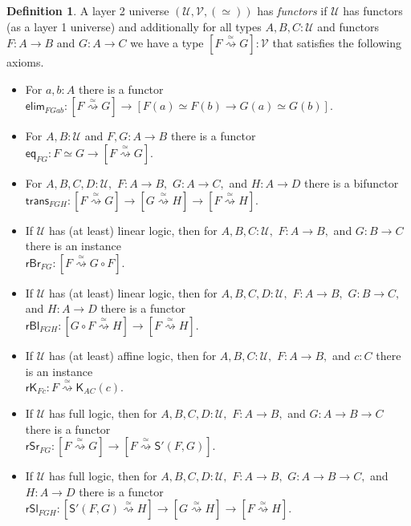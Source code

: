 \documentclass[a4paper]{article}
\theoremstyle{definition}
\newtheorem{definition}{Definition}[section]
\theoremstyle{remark}
\newcommand{\defn}{\emph}
\renewcommand{\equiv}{\simeq}
\newcommand{\equivto}{\overset{\equiv}{\rightsquigarrow}}
\newcommand{\U}{\mathcal{U}}
\newcommand{\V}{\mathcal{V}}
\newcommand{\nm}{\mathsf}
\newcommand{\elim}{\nm{elim}}
\newcommand{\combinator}{\nm}
\newcommand{\constFun}{\combinator{K}}
\newcommand{\substFun}{\combinator{S'}}
\begin{document}
\begin{definition}
  A layer 2 universe $(\U,\V,(\equiv))$ has \defn{functors} if $\U$ has functors (as a layer 1
  universe) and additionally for all types $A,B,C : \U$ and functors $F : A \to B$ and $G : A \to C$
  we have a type $[F \equivto G] : \V$ that satisfies the following axioms.
  \begin{itemize}
    \item For $a,b : A$ there is a functor\\
    $\elim_{FGab} : [F \equivto G] \to [F(a) \equiv F(b) \to G(a) \equiv G(b)].$
    \item For $A,B : \U$ and $F,G : A \to B$ there is a functor\\
    $\nm{eq}_{FG} : F \equiv G \to [F \equivto G].$
    \item For $A,B,C,D : \U,$ $F : A \to B,$ $G : A \to C,$ and $H : A \to D$ there is a bifunctor\\
    $\nm{trans}_{FGH} : [F \equivto G] \to [G \equivto H] \to [F \equivto H].$
    \item If $\U$ has (at least) linear logic, then for $A,B,C : \U,$ $F : A \to B,$ and
    $G : B \to C$ there is an instance\\
    $\nm{rBr}_{FG} : [F \equivto G \circ F].$
    \item If $\U$ has (at least) linear logic, then for $A,B,C,D : \U,$ $F : A \to B,$
    $G : B \to C,$ and $H : A \to D$ there is a functor\\
    $\nm{rBl}_{FGH} : [G \circ F \equivto H] \to [F \equivto H].$
    \item If $\U$ has (at least) affine logic, then for $A,B,C : \U,$ $F : A \to B,$ and $c : C$
    there is an instance\\
    $\nm{rK}_{Fc} : F \equivto \constFun_{AC}(c).$
    \item If $\U$ has full logic, then for $A,B,C,D : \U,$ $F : A \to B,$ and $G : A \to B \to C$
    there is a functor\\
    $\nm{rSr}_{FG} : [F \equivto G] \to [F \equivto \substFun(F,G)].$
    \item If $\U$ has full logic, then for $A,B,C,D : \U,$ $F : A \to B,$ $G : A \to B \to C,$ and
    $H : A \to D$ there is a functor\\
    $\nm{rSl}_{FGH} : [\substFun(F,G) \equivto H] \to [G \equivto H] \to [F \equivto H].$
  \end{itemize}
\end{definition}
\end{document}
